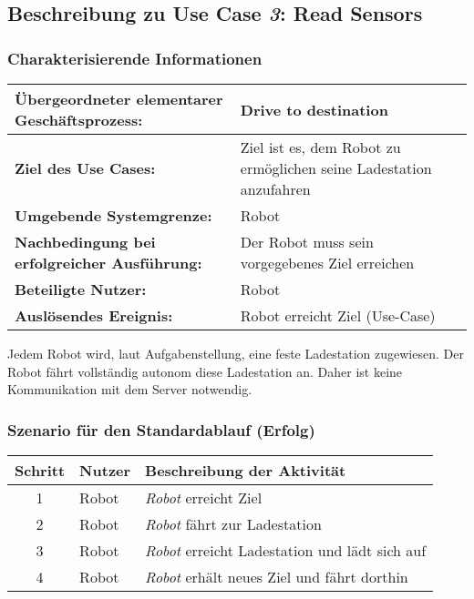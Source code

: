 \documentclass[includeheaders]{scrartcl}
\begin{document}

		\subsection{Beschreibung zu Use Case \emph{3}: Read Sensors}

			\subsubsection*{Charakterisierende Informationen}

			\begin{table}[H]
				\centering
				\begin{tabularx}{\textwidth}{@{}p{5cm}X@{}}
				\toprule
				\textbf{Übergeordneter elementarer Geschäftsprozess:} & Drive to destination\\ \midrule
				\textbf{Ziel des Use Cases:} & Ziel ist es, dem Robot zu ermöglichen seine Ladestation anzufahren\\ \midrule
				\textbf{Umgebende Systemgrenze:} & Robot\\ \midrule
				\textbf{Nachbedingung bei erfolgreicher Ausführung:} & Der Robot muss sein vorgegebenes Ziel erreichen\\ \midrule
				\textbf{Beteiligte Nutzer:} & Robot\\ \midrule
				\textbf{Auslösendes Ereignis:} & Robot erreicht Ziel (Use-Case)\\
				\bottomrule
				\end{tabularx}
			\end{table}

			Jedem Robot wird, laut Aufgabenstellung, eine feste Ladestation zugewiesen. Der Robot fährt vollständig autonom diese Ladestation an. Daher ist keine Kommunikation mit dem Server notwendig.

			\subsubsection*{Szenario für den Standardablauf (Erfolg)}

			\begin{table}[H]
				\centering
				\begin{tabularx}{\textwidth}{@{}cp{2cm}X@{}}
				\toprule
				Schritt & Nutzer & Beschreibung der Aktivität \\ \midrule
				1 & Robot & \emph{Robot} erreicht Ziel \\
				2 & Robot & \emph{Robot} fährt zur Ladestation \\
				3 & Robot & \emph{Robot} erreicht Ladestation und lädt sich auf \\
				4 & Robot & \emph{Robot} erhält neues Ziel und fährt dorthin \\
				\bottomrule
				\end{tabularx}
			\end{table}
\end{document}
